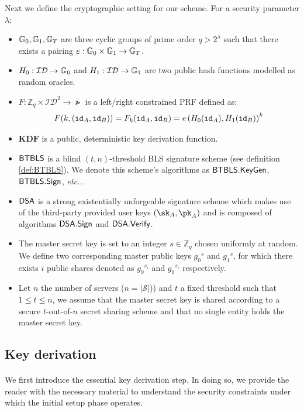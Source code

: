 		\noindent Next we define the cryptographic setting for our scheme. For a security parameter $\lambda$:
		\begin{itemize}
			\item $\mathbb{G}_0, \mathbb{G}_1, \mathbb{G}_T$ are three cyclic groups of prime order $q > 2^{\lambda}$ such that there exists a pairing $e : \mathbb{G}_0 \times \mathbb{G}_1 \rightarrow \mathbb{G}_T$.
			\item $H_0: \mathcal{ID}\rightarrow \mathbb{G}_0$  and $H_1: \mathcal{ID} \rightarrow \mathbb{G}_1$ are two public hash functions modelled as random oracles.
			\item $F: \mathbb{Z}_q \times \mathcal{ID}^2  \rightarrow \Gt$ is a left/right constrained PRF defined as: \begin{equation}
				F(k, (\mathtt{id}_A, \mathtt{id}_B)) = F_k(\mathtt{id}_A, \mathtt{id}_B)= e\left(H_0(\mathtt{id}_A), H_1(\mathtt{id}_B) \right)^k
			\end{equation}
			\item $\mathbf{KDF}$ is a public, deterministic key derivation function.
			\item $\mathsf{BTBLS}$ is a blind $(t,n)$-threshold BLS signature scheme (see definition \autoref{def:BTBLS}). We denote this scheme's algorithms as $\mathsf{BTBLS} . \mathsf{KeyGen}$, $\mathsf{BTBLS} . \mathsf{Sign}$, \textit{etc...} 
			\item $\mathsf{DSA}$ is a strong existentially unforgeable signature scheme which makes use of the third-party provided user keys $(\sk_A,\pk_A)$ and is composed of algorithms $\mathsf{DSA} . \mathsf{Sign}$ and $\mathsf{DSA} . \mathsf{Verify}$.
			\item The master secret key is set to an integer $s \in \mathbb{Z}_q$ chosen uniformly at random. We define two corresponding master public keys ${g_0}^s$ and ${g_1}^s$, for which there exists $i$ public shares denoted as ${g_0}^{s_i}$ and ${g_1}^{s_i}$ respectively.
			\item Let $n$ the number of servers ($n=|\mathcal{S}|$)) and $t$ a fixed threshold such that $1 \leq t \leq n$, we assume that the master secret key is shared according to a secure $t$-out-of-$n$ secret sharing scheme and that no single entity holds the master secret key.
		\end{itemize}

	\subsection{Key derivation}
	
		\paragraph{} We first introduce the essential key derivation step. In doing so, we provide the reader with the necessary material to understand the security constraints under which the initial setup phase operates.
		
